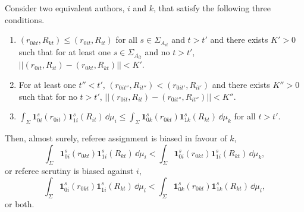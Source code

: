 \begin{theorem}\label{Theorem1}
	Consider two equivalent authors, $i$ and $k$, that satisfy the following three conditions.
	\begin{enumerate}[label=Condition \arabic*., leftmargin=*, widest*=2]
		\item $(r_{0kt},R_{kt})\le(r_{0it},R_{it})$ for all $s\in\Sigma_{A_{it}}$ and $t>t'$ and there exists $K'>0$ such that for at least one $s\in\Sigma_{A_{it}}$ and no $t>t'$, $||(r_{0it},R_{it})-(r_{0kt},R_{kt})||<K'$.
		\item For at least one $t''<t'$, $(r_{0it''},R_{it''})<(r_{0it'},R_{it'})$ and there exists $K''>0$ such that for no $t>t'$, $||(r_{0it},R_{it})-(r_{0it''},R_{it''})||<K''$.
		\item $\int_\Sigma\!\bm1_{0i}^s(r_{0it})\bm1_{1i}^s(R_{it})\,\dd\mu_i\le \int_\Sigma\!\bm1_{0k}^s(r_{0kt})\bm1_{1k}^s(R_{kt})\,\dd\mu_k$ for all $t>t'$.
	\end{enumerate}
Then, almost surely, referee assignment is biased in favour of $k$, $$\int_\Sigma\!\bm1_{0i}^s(r_{0kt})\bm1_{1i}^s(R_{kt})\,\dd\mu_i<\int_\Sigma\!\bm1_{0i}^s(r_{0kt})\bm1_{1i}^s(R_{kt})\,\dd\mu_k,$$ or referee scrutiny is biased against $i$, $$\int_\Sigma\!\bm1_{0i}^s(r_{0kt})\bm1_{1i}^s(R_{kt})\,\dd\mu_i<\int_\Sigma\!\bm1_{0k}^s(r_{0kt})\bm1_{1k}^s(R_{kt})\,\dd\mu_i,$$
or both.
\end{theorem}